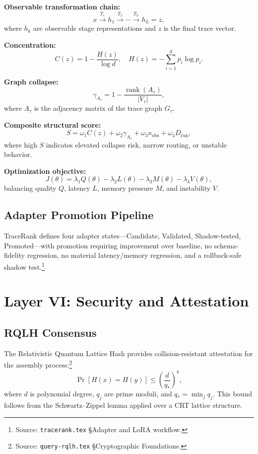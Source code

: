 \documentclass[11pt]{article}
\theoremstyle{remark}
\begin{document}
\textbf{Observable transformation chain:}
\[
x \xrightarrow{T_1} h_1 \xrightarrow{T_2} \cdots \xrightarrow{T_L} h_L = z,
\]
where $h_k$ are observable stage representations and $z$ is the final trace vector.

\textbf{Concentration:}
\[
C(z) = 1 - \frac{H(z)}{\log d}, \quad H(z) = -\sum_{i=1}^d p_i \log p_i.
\]

\textbf{Graph collapse:}
\[
\gamma_{A_\tau} = 1 - \frac{\operatorname{rank}(A_\tau)}{|V_\tau|},
\]
where $A_\tau$ is the adjacency matrix of the trace graph $G_\tau$.

\textbf{Composite structural score:}
\begin{equation}
S = \omega_1 C(z) + \omega_2 \gamma_{A_\tau} + \omega_3 \kappa_{\mathrm{obs}} + \omega_4 D_{\mathrm{run}},
\end{equation}
where high $S$ indicates elevated collapse risk, narrow routing, or unstable behavior.

\textbf{Optimization objective:}
\begin{equation}
J(\theta) = \lambda_1 Q(\theta) - \lambda_2 L(\theta) - \lambda_3 M(\theta) - \lambda_4 V(\theta),
\end{equation}
balancing quality $Q$, latency $L$, memory pressure $M$, and instability $V$.

\subsection{Adapter Promotion Pipeline}
\label{subsec:adapters}

TraceRank defines four adapter states---Candidate, Validated, Shadow-tested, Promoted---with promotion requiring improvement over baseline, no schema-fidelity regression, no material latency/memory regression, and a rollback-safe shadow test.\footnote{Source: \texttt{tracerank.tex} \S Adapter and LoRA workflow.}

\section{Layer VI: Security and Attestation}
\label{sec:security}

\subsection{RQLH Consensus}
\label{subsec:rqlh}

The Relativistic Quantum Lattice Hash provides collision-resistant attestation for the assembly process:\footnote{Source: \texttt{query-rqlh.tex} \S Cryptographic Foundations.}
\[
\Pr[H(x) = H(y)] \le \left(\frac{d}{q_*}\right)^k,
\]
where $d$ is polynomial degree, $q_j$ are prime moduli, and $q_* = \min_j q_j$. This bound follows from the Schwartz--Zippel lemma applied over a CRT lattice structure.
\end{document}
